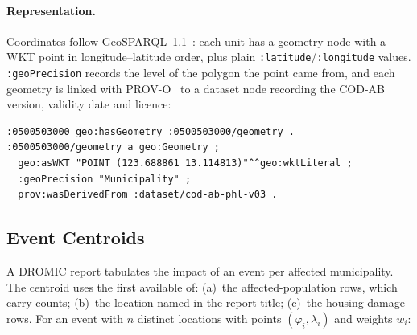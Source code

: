 \documentclass[acmtog]{acmart}
\begin{document}
\paragraph{Representation.} Coordinates follow GeoSPARQL~1.1~\cite{ogc2024geosparql}: each unit
has a geometry node with a WKT point in longitude--latitude order, plus plain
\texttt{:latitude}/\texttt{:longitude} values. \texttt{:geoPrecision} records the level of the
polygon the point came from, and each geometry is linked with PROV-O~\cite{w3c2013provo} to a
dataset node recording the COD-AB version, validity date and licence:
{\scriptsize
\begin{verbatim}
:0500503000 geo:hasGeometry :0500503000/geometry .
:0500503000/geometry a geo:Geometry ;
  geo:asWKT "POINT (123.688861 13.114813)"^^geo:wktLiteral ;
  :geoPrecision "Municipality" ;
  prov:wasDerivedFrom :dataset/cod-ab-phl-v03 .
\end{verbatim}
}

\subsection{Event Centroids}

A DROMIC report tabulates the impact of an event per affected municipality. The centroid uses
the first available of: (a)~the affected-population rows, which carry counts; (b)~the location
named in the report title; (c)~the housing-damage rows. For an event with $n$ distinct locations
with points $(\varphi_i, \lambda_i)$ and weights $w_i$:
\end{document}
